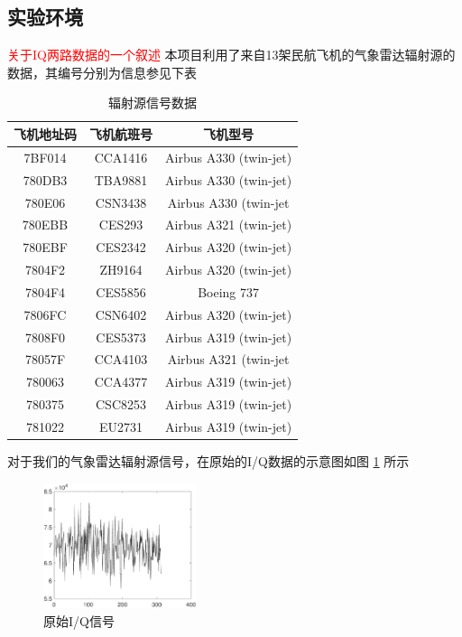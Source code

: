 \subsection{实验环境}
\textcolor{red}{关于IQ两路数据的一个叙述}
本项目利用了来自13架民航飞机的气象雷达辐射源的数据，其编号分别为信息参见下表
\begin{table}[H]
	\renewcommand{\arraystretch}{1.3}
	\caption{辐射源信号数据}
	\centering
	\begin{tabular}{c|c|c}
		\hline
		 飞机地址码 & 飞机航班号 & 飞机型号  \\
		 \hline
		 7BF014 & CCA1416 & Airbus A330 (twin-jet)\\
		 780DB3 & TBA9881 & Airbus A330 (twin-jet) \\
		 780E06 & CSN3438 & Airbus A330 (twin-jet\\
		 780EBB & CES293 & 	Airbus A321 (twin-jet)\\
		 780EBF & CES2342 & Airbus A320 (twin-jet)\\
		 7804F2 & ZH9164 & Airbus A320 (twin-jet)\\
		 7804F4 & CES5856 & Boeing 737\\
		 7806FC & CSN6402 & Airbus A320 (twin-jet)\\
		 7808F0 & CES5373 & Airbus A319 (twin-jet)\\
		 78057F & CCA4103 & Airbus A321 (twin-jet\\
		 780063 & CCA4377 & Airbus A319 (twin-jet)\\
		 780375 & CSC8253 & Airbus A319 (twin-jet)	\\
		 781022 & EU2731 & Airbus A319 (twin-jet)\\
		 \hline
	\end{tabular}
\end{table}
对于我们的气象雷达辐射源信号，在原始的I/Q数据的示意图如图 \ref{fig:IQ} 所示
\begin{figure}[htb]
	\centering
	\includegraphics[width=0.4\textwidth]{figures/emitter/IQA}
	\caption{原始I/Q信号}
	\label{fig:IQ}
\end{figure}

